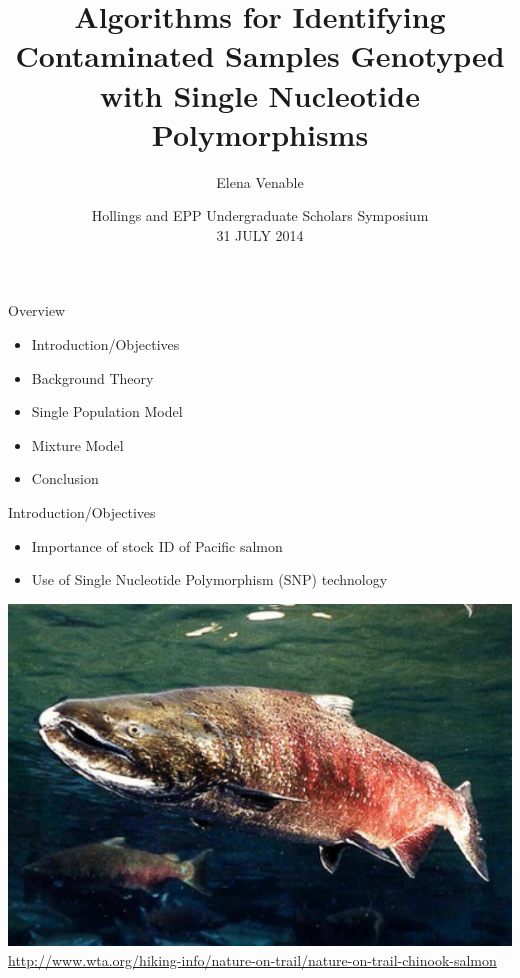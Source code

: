 \documentclass[letter,graphicx]{beamer}
\title[SNP contamination identification with Bayesian methods\hspace{2em}\insertframenumber] %
{Algorithms for Identifying Contaminated Samples Genotyped with Single Nucleotide Polymorphisms}
\subtitle{} %
\author[Elena Venable] %
{Elena Venable}
\institute[Brown Univeristy] %
{
Brown University \\ Applied Mathematics - Biology \\ Healthy Oceans \\ Southwest Fisheries Science Center, Santa Cruz, CA \\ Eric C. Anderson
}
\date[CSGM--2014] %
{
 Hollings and EPP Undergraduate Scholars Symposium \\ 31 JULY 2014}
\def\Tiny{\fontsize{3pt}{3pt} \selectfont}
\begin{document}
\begin{frame}
  \titlepage
\end{frame}

\begin{frame}{Overview}
   \begin{itemize}
	\item Introduction/Objectives
	\item Background Theory
	\item Single Population Model
	\item Mixture Model
	\item Conclusion
   \end{itemize}
\end{frame}

\begin{frame}{Introduction/Objectives}
   \begin{itemize}
	\item Importance of stock ID of Pacific salmon
		\vspace{2mm}
	\item Use of Single Nucleotide Polymorphism (SNP) technology
   \end{itemize}
   \vspace{2mm}
  \centering  \includegraphics[width=.75\textwidth]{images/salmon_individual}
  \Tiny
  \url{http://www.wta.org/hiking-info/nature-on-trail/nature-on-trail-chinook-salmon}
   
\end{frame}
\end{document}
